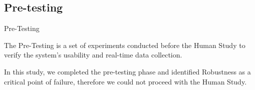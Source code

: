 \subsection*{Pre-testing}
\begin{frame}{Pre-Testing}
    \begin{minipage}[c]{.69\textwidth}       
        The Pre-Testing is a set of experiments conducted before the Human Study to verify the system's usability and real-time data collection.

        \vspace*{.5cm}
        In this study, we completed the pre-testing phase and identified Robustness as a critical point of failure, therefore we could not proceed with the Human Study.


\end{minipage}
\end{frame}
